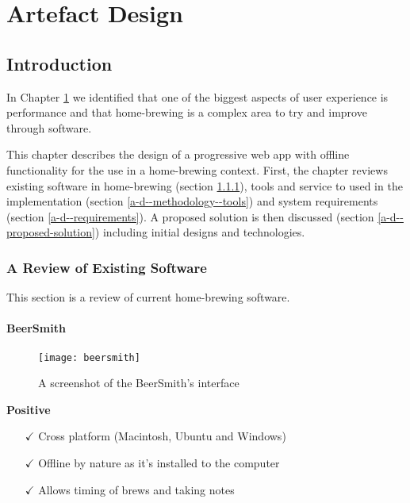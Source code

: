 \chapter{Artefact Design} \label{a-d}

\section{Introduction} \label{a-d--introduction}

In Chapter \ref{a-d} we identified that one of the biggest aspects of user experience is performance and that home-brewing is a complex area to try and improve through software.

This chapter describes the design of a progressive web app with offline functionality for the use in a home-brewing context. First, the chapter reviews existing software in home-brewing (section \ref{a-d--review-of-existing-software}), tools and service to used in the implementation (section \ref{a-d--methodology--tools}) and system requirements (section \ref{a-d--requirements}). A proposed solution is then discussed (section \ref{a-d--proposed-solution}) including initial designs and technologies.

\subsection{A Review of Existing Software} \label{a-d--review-of-existing-software}

This section is a review of current home-brewing software.

\subsubsection{BeerSmith}

\begin{figure}[H]
  \centering
    \texttt{[image: beersmith]}
  \caption{A screenshot of the BeerSmith's interface}
  \label{figure-maltio}
\end{figure}

\noindent\textbf{Positive}

\begin{itemize}
  \item[$\checkmark$] Cross platform (Macintosh, Ubuntu and Windows)
  \item[$\checkmark$] Offline by nature as it's installed to the computer
  \item[$\checkmark$] Allows timing of brews and taking notes
\end{itemize}

